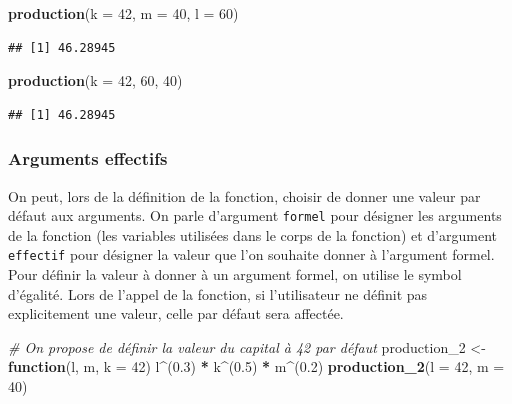 \documentclass[
  11pt,
]{book}
\newenvironment{Shaded}{\begin{snugshade}}{\end{snugshade}}
\newcommand{\CommentTok}[1]{\textcolor[rgb]{0.56,0.35,0.01}{\textit{#1}}}
\newcommand{\ControlFlowTok}[1]{\textcolor[rgb]{0.13,0.29,0.53}{\textbf{#1}}}
\newcommand{\DataTypeTok}[1]{\textcolor[rgb]{0.13,0.29,0.53}{#1}}
\newcommand{\DecValTok}[1]{\textcolor[rgb]{0.00,0.00,0.81}{#1}}
\newcommand{\FloatTok}[1]{\textcolor[rgb]{0.00,0.00,0.81}{#1}}
\newcommand{\KeywordTok}[1]{\textcolor[rgb]{0.13,0.29,0.53}{\textbf{#1}}}
\newcommand{\NormalTok}[1]{#1}
\newcommand{\OperatorTok}[1]{\textcolor[rgb]{0.81,0.36,0.00}{\textbf{#1}}}
\newcommand{\StringTok}[1]{\textcolor[rgb]{0.31,0.60,0.02}{#1}}
\numberwithin{equation}{section}
\numberwithin{countremarque}{section}
\begin{document}
\begin{Shaded}
\begin{Highlighting}[]
\KeywordTok{production}\NormalTok{(}\DataTypeTok{k =} \DecValTok{42}\NormalTok{, }\DataTypeTok{m =} \DecValTok{40}\NormalTok{, }\DataTypeTok{l =} \DecValTok{60}\NormalTok{)}
\end{Highlighting}
\end{Shaded}

\begin{lstlisting}
## [1] 46.28945
\end{lstlisting}

\begin{Shaded}
\begin{Highlighting}[]
\KeywordTok{production}\NormalTok{(}\DataTypeTok{k =} \DecValTok{42}\NormalTok{, }\DecValTok{60}\NormalTok{, }\DecValTok{40}\NormalTok{)}
\end{Highlighting}
\end{Shaded}

\begin{lstlisting}
## [1] 46.28945
\end{lstlisting}

\hypertarget{fonctions_structure_parametres_defaut}{%
\subsubsection{Arguments effectifs}\label{fonctions_structure_parametres_defaut}}

On peut, lors de la définition de la fonction, choisir de donner une valeur par défaut aux arguments. On parle d'argument \texttt{formel} pour désigner les arguments de la fonction (les variables utilisées dans le corps de la fonction) et d'argument \texttt{effectif} pour désigner la valeur que l'on souhaite donner à l'argument formel. Pour définir la valeur à donner à un argument formel, on utilise le symbol d'égalité. Lors de l'appel de la fonction, si l'utilisateur ne définit pas explicitement une valeur, celle par défaut sera affectée.

\begin{Shaded}
\begin{Highlighting}[]
\CommentTok{\# On propose de définir la valeur du capital à 42 par défaut}
\NormalTok{production\_}\DecValTok{2}\NormalTok{ \textless{}{-}}\StringTok{ }\ControlFlowTok{function}\NormalTok{(l, m, }\DataTypeTok{k =} \DecValTok{42}\NormalTok{) l}\OperatorTok{\^{}}\NormalTok{(}\FloatTok{0.3}\NormalTok{) }\OperatorTok{*}\StringTok{ }\NormalTok{k}\OperatorTok{\^{}}\NormalTok{(}\FloatTok{0.5}\NormalTok{) }\OperatorTok{*}\StringTok{ }\NormalTok{m}\OperatorTok{\^{}}\NormalTok{(}\FloatTok{0.2}\NormalTok{)}
\KeywordTok{production\_2}\NormalTok{(}\DataTypeTok{l =} \DecValTok{42}\NormalTok{, }\DataTypeTok{m =} \DecValTok{40}\NormalTok{)}
\end{Highlighting}
\end{Shaded}
\end{document}
